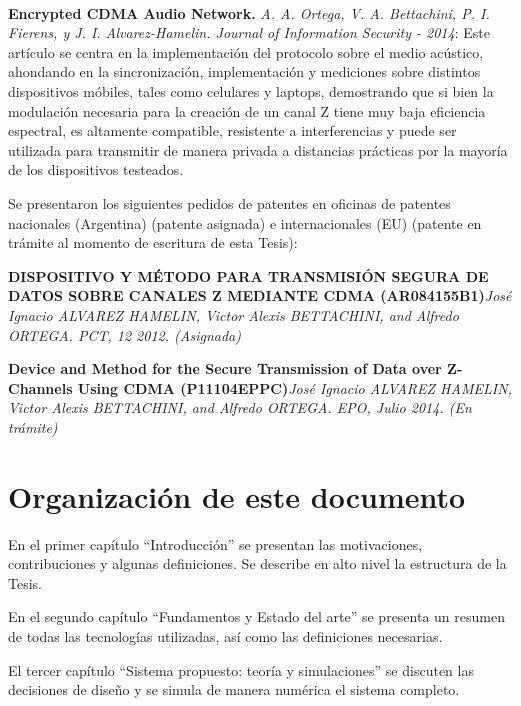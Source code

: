 \

\textbf{Encrypted CDMA Audio Network.} \textit{ A. A. Ortega, V. A. Bettachini, P. I. Fierens, y J. I. Alvarez-Hamelin.  Journal of Information Security - 2014}: Este artículo se centra en la implementación del protocolo sobre el medio acústico, ahondando en la sincronización, implementación y mediciones sobre distintos dispositivos móbiles, tales como celulares y laptops, demostrando que si bien la modulación necesaria para la creación de un canal Z tiene muy baja eficiencia espectral, es altamente compatible, resistente a interferencias y puede ser utilizada para transmitir de manera privada a distancias prácticas por la mayoría de los dispositivos testeados.



Se presentaron los siguientes pedidos de patentes en oficinas de patentes nacionales (Argentina) (patente asignada) e internacionales (EU) (patente en trámite al momento de escritura de esta Tesis):

\textbf{DISPOSITIVO Y MÉTODO PARA TRANSMISIÓN SEGURA DE DATOS SOBRE CANALES Z MEDIANTE CDMA (AR084155B1)}\textit{José Ignacio ALVAREZ HAMELIN, Victor Alexis BETTACHINI, and Alfredo ORTEGA. PCT, 12 2012. (Asignada)}

\textbf{Device and Method for the Secure Transmission of Data over Z-Channels Using CDMA (P11104EPPC)}\textit{José Ignacio ALVAREZ HAMELIN, Victor Alexis BETTACHINI, and Alfredo ORTEGA. EPO, Julio 2014. (En trámite)}




\section{Organización de este documento}

En el primer capítulo ``Introducción'' se presentan las motivaciones, contribuciones y algunas definiciones. Se describe en alto nivel la estructura de la Tesis.

En el segundo capítulo ``Fundamentos y Estado del arte'' se presenta un resumen de todas las tecnologías utilizadas, así como las definiciones necesarias.

El tercer capítulo ``Sistema propuesto: teoría y simulaciones'' se discuten las decisiones de diseño y se simula de manera numérica el sistema completo.


